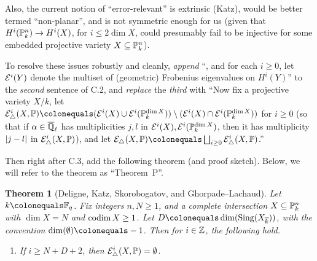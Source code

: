 \documentclass[12pt]{article}
\begin{document}
\begin{itemize}
    
    
    Also, the current notion of ``error-relevant'' is extrinsic (Katz),
    would be better termed ``non-planar'',
    and is not symmetric enough for us (given that $H^i(\mathbb{P}^n_k)\to H^i(X)$, for $i\leq 2\dim{X}$, could presumably fail to be injective for some embedded projective variety $X\subseteq \mathbb{P}^n_k$).
    
    To resolve these issues robustly and cleanly,
    \emph{append} ``, and for each $i\geq 0$, let $\mathcal{E}^i(Y)$ denote the multiset of (geometric) Frobenius eigenvalues on $H^i(Y)$'' to the \emph{second} sentence of C.2,
    and \emph{replace} the \emph{third} with
    ``Now fix a projective variety $X/k$,
    let $\mcal{E}^i_{\triangle}(X,\PP)\defeq (\mcal{E}^i(X)\cup \mcal{E}^i(\PP^{\dim{X}}_k))\setminus (\mcal{E}^i(X)\cap \mcal{E}^i(\PP^{\dim{X}}_k))$ for $i\geq 0$
    (so that if $\alpha\in \overline{\mathbb{Q}}_\ell$ has multiplicities $j,l$ in $\mathcal{E}^i(X),\mathcal{E}^i(\mathbb{P}^{\dim{X}}_k)$, then it has multiplicity $\lvert j-l \rvert$ in $\mathcal{E}^i_{\triangle}(X,\mathbb{P})$),
    and let $\mcal{E}_{\triangle}(X,\PP)\defeq \bigsqcup_{i\geq 0}\mcal{E}^i_{\triangle}(X,\PP)$.''
    
    Then right after C.3, add the following theorem (and proof sketch).
    Below, we will refer to the theorem as ``Theorem~P''.
    \theoremstyle{plain}
    \newtheorem*{theorem*}{Theorem}
    \begin{theorem*}
    [Deligne, Katz, Skorobogatov, and Ghorpade--Lachaud]
    \label{THM:general-perversity-result}
    Let $k\defeq \FF_q$.
    Fix integers $n,N\geq 1$,
    and a complete intersection $X\subseteq \mathbb{P}^n_k$ with $\dim{X} = N$ and $\operatorname{codim}{X}\geq 1$.
    Let $D\defeq \dim(\map{Sing}(X_{\ol{k}}))$, with the convention $\dim(\emptyset)\defeq -1$.
    Then for $i\in \mathbb{Z}$, the following hold.
    \begin{enumerate}
        \item If $i\geq N+D+2$, then $\mathcal{E}^i_{\triangle}(X,\mathbb{P}) = \emptyset$.
        

\end{enumerate}
\end{theorem*}
\end{itemize}
\end{document}
